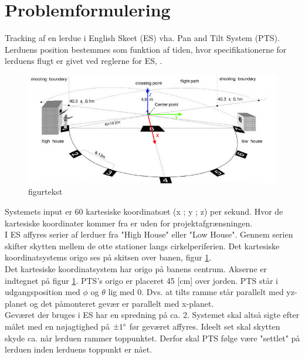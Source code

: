 \section{Problemformulering}
Tracking af en lerdue i English Skeet (ES) vha. Pan and Tilt System (PTS). 
Lerduens position bestemmes som funktion af tiden, hvor specifikationerne for lerduens flugt er givet ved reglerne for ES, \citep{ES_regler}.

\begin{figure}[th!]
\centering
\includegraphics[width=1\textwidth]{./graphics/skeet_diagram_cropped_axes}
\caption[tekst i indholdsfortegnelsen]{figurtekst}
\label{fig:ES}
\end{figure}	
Systemets input er 60 kartesiske koordinatsæt (x ; y ; z) per sekund. Hvor de kartesiske koordinater kommer fra er uden for projektafgrænsningen. \\

I ES affyres serier af lerduer fra "High House" eller "Low House". Gennem serien skifter skytten mellem de otte stationer langs cirkelperiferien. Det kartesiske koordinatsystems origo ses på skitsen over banen, figur \ref{fig:ES}.\\

Det kartesiske koordinatsystem har origo på banens centrum. Akserne er indtegnet på figur \ref{fig:ES}. PTS's origo er placeret 45 [cm] over jorden. PTS står i udgangsposition med \(\phi\) og \(\theta\) lig med 0. Dvs. at tilts ramme står parallelt med yz-planet og det påmonteret gevær er parallelt med x-planet.\\

Geværet der bruges i ES har en spredning på ca. 2\degree. Systemet skal altså sigte efter målet med en nøjagtighed på \(\pm 1 \degree\) før geværet affyres. Ideelt set skal skytten skyde ca. når lerduen rammer toppunktet. Derfor skal PTS følge være "settlet" på lerduen inden lerduens toppunkt er nået.\\

